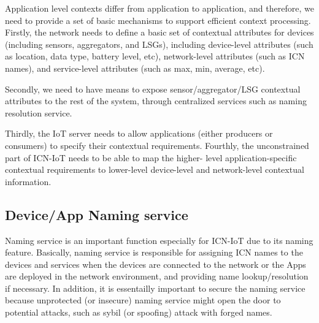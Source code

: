 Application level contexts differ from application to application,
and therefore, we need to provide a set of basic mechanisms to
support efficient context processing.  Firstly, the network needs to
define a basic set of contextual attributes for devices (including
sensors, aggregators, and LSGs), including device-level attributes
(such as location, data type, battery level, etc), network-level
attributes (such as ICN names), and service-level attributes (such as
max, min, average, etc).

Secondly, we need to have means to expose sensor/aggregator/LSG
contextual attributes to the rest of the system, through centralized
services such as naming resolution service.

Thirdly, the IoT server needs to allow applications (either producers
or consumers) to specify their contextual requirements.  Fourthly,
the unconstrained part of ICN-IoT needs to be able to map the higher-
level application-specific contextual requirements to lower-level
device-level and network-level contextual information.


\subsection{Device/App Naming service}\label{sec:naming}
Naming service is an important function especially for ICN-IoT due to its naming feature. Basically, naming service is responsible for assigning ICN names to the devices and services when the devices are connected to the network or the Apps are deployed in the network environment, and providing name lookup/resolution if necessary. In addition, it is essentailly important to secure the naming service because unprotected (or insecure) naming service might open the door to potential attacks, such as sybil (or spoofing) attack \cite{sybil} with forged names.


